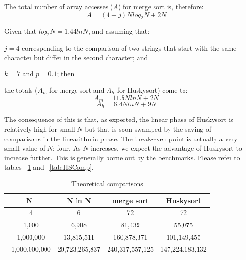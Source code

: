 \documentclass[acmtog]{acmart}
\begin{document}
The total number of array accesses ($A$) for merge sort is, therefore:
\[A = (4 + j) N log_2 N + 2 N\]
 
Given that $log_2 N = 1.44 ln N$, and assuming that:

$j = 4$ corresponding to the comparison of two strings that start with the same character but differ in the second character; and

$k = 7$ and $p = 0.1$; then

the totals ($A_m$ for merge sort and $A_h$ for Huskysort) come to:
 \[A_m = 11.5 N ln N + 2 N\]
 \[A_h = 6.4 N ln N + 9 N\]
 
The consequence of this is that, as expected, the linear phase of Huskysort is relatively high for small $N$ but that is soon swamped by the saving of comparisons in the linearithmic phase.
The break-even point is actually a very small value of $N$: four.
As $N$ increases, we expect the advantage of Huskysort to increase further.
This is generally borne out by the benchmarks.
Please refer to tables ~\ref{tab:Comparison} and ~\ref{tab:HSComp}.
 \begin{table}
  \caption{Theoretical comparisons}
  \label{tab:Comparison}
  \begin{tabular}{cccc}
    \toprule
    N  &  N ln N & merge sort & Huskysort \\
    \midrule
     \ 4 &6 &72 &72 \\
     \ 1,000 &6,908 &81,439  &55,075  \\
     \ 1,000,000 &13,815,511  &160,878,371  &101,149,455  \\
     \ 1,000,000,000 &20,723,265,837  &240,317,557,125  &147,224,183,132  \\

    \bottomrule
  \end{tabular}
\end{table}
\end{document}
